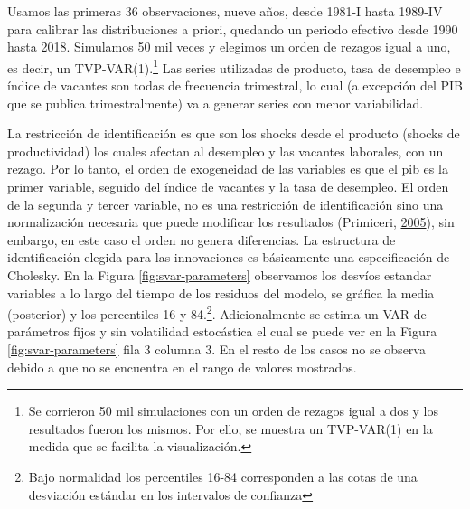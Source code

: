 \documentclass[12pt,oneside]{reedthesis}
\begin{document}
Usamos las primeras 36 observaciones, nueve años, desde 1981-I hasta 1989-IV para calibrar las distribuciones a priori, quedando un periodo efectivo desde 1990 hasta 2018. Simulamos 50 mil veces y elegimos un orden de rezagos igual a uno, es decir, un TVP-VAR(1).\footnote{Se corrieron 50 mil simulaciones con un orden de rezagos igual a dos y los resultados fueron los mismos. Por ello, se muestra un TVP-VAR(1) en la medida que se facilita la visualización.} Las series utilizadas de producto, tasa de desempleo e índice de vacantes son todas de frecuencia trimestral, lo cual (a excepción del PIB que se publica trimestralmente) va a generar series con menor variabilidad.

La restricción de identificación es que son los shocks desde el producto (shocks de productividad) los cuales afectan al desempleo y las vacantes laborales, con un rezago. Por lo tanto, el orden de exogeneidad de las variables es que el pib es la primer variable, seguido del índice de vacantes y la tasa de desempleo. El orden de la segunda y tercer variable, no es una restricción de identificación sino una normalización necesaria que puede modificar los resultados (Primiceri, \protect\hyperlink{ref-Primiceri2005}{2005}), sin embargo, en este caso el orden no genera diferencias. La estructura de identificación elegida para las innovaciones es básicamente una especificación de Cholesky. En la Figura \ref{fig:svar-parameters} observamos los desvíos estandar variables a lo largo del tiempo de los residuos del modelo, se gráfica la media (posterior) y los percentiles 16 y 84.\footnote{Bajo normalidad los percentiles 16-84 corresponden a las cotas de una desviación estándar en los intervalos de confianza}. Adicionalmente se estima un VAR de parámetros fijos y sin volatilidad estocástica el cual se puede ver en la Figura \ref{fig:svar-parameters} fila 3 columna 3. En el resto de los casos no se observa debido a que no se encuentra en el rango de valores mostrados.
\end{document}

